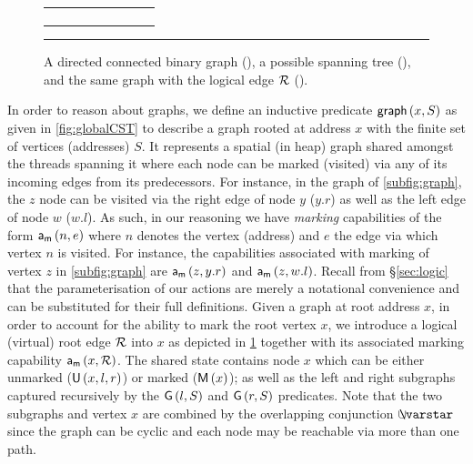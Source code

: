 \begin{figure}
\begin{tabular}{c c c}
\begin{subfigure}[b]{0.3\columnwidth}
    \caption{}
    \label{subfig:graphWithRootEdge}
    \end{subfigure}
    \end{tabular}
\hrule
\caption{A directed connected binary graph (), a possible spanning tree (), and the same graph with the logical edge $\mathcal{R}$ ().}
\label{fig:graphAndTree}
\end{figure}

In order to reason about graphs, we define an inductive predicate $\textsf{graph}\left(x, S\right)$ as given in \fig\ref{fig:globalCST} to describe a graph rooted at address $x$ with the finite set of vertices (addresses) $S$. It represents a spatial (in heap) graph shared amongst the threads spanning it where each node can be marked (visited) via any of its incoming edges from its predecessors. For instance, in the graph of \fig\ref{subfig:graph}, the $z$ node can be visited via the right edge of node $y$ ($y.r$) as well as the left edge of node $w$ ($w.l$). As such, in our reasoning we have \emph{marking} capabilities of the form $\mathsf{a}_{\textsf{m}}\left(n, e\right)$ where $n$ denotes the vertex (address) and $e$ the edge via which vertex $n$ is visited. For instance, the capabilities associated with marking of vertex $z$ in \fig\ref{subfig:graph} are $\mathsf{a}_{\textsf{m}}\left(z, y.r\right)$ and $\mathsf{a}_{\textsf{m}}\left(z, w.l\right)$. Recall from \S\ref{sec:logic} that the parameterisation of our actions are merely a notational convenience and can be substituted for their full definitions. Given a graph  at root address $x$, in order to account for the ability to mark the root vertex $x$, we introduce a logical (virtual) root edge $\mathcal{R}$ into $x$ as depicted in \fig\ref{subfig:graphWithRootEdge} together with its associated marking capability $\mathsf{a}_{\textsf{m}}\left(x, \mathcal{R}\right)$. The shared state contains node $x$ which can be either unmarked ($\textsf{U}\left(x, l, r\right)$) or marked ($\textsf{M}\left(x\right)$); as well as the left and right subgraphs captured recursively by the $\textsf{G}\left(l, S\right)$ and $\textsf{G}\left(r, S\right)$ predicates. Note that the two subgraphs and vertex $x$ are combined by the overlapping conjunction $\sepish$ since the graph can be cyclic and each node may be reachable via more than one path. 

